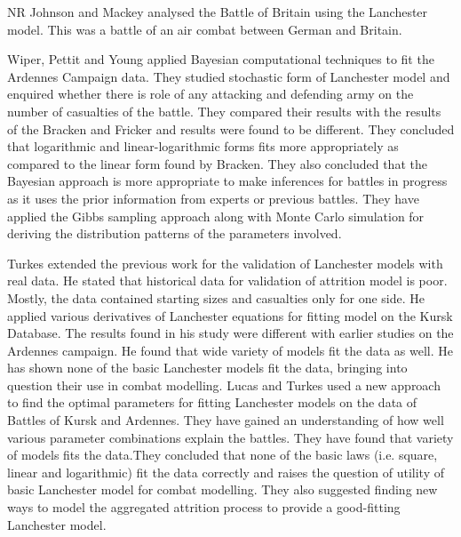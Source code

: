 \documentclass[]{article}
\begin{document}
NR Johnson and Mackey \autocite{JohsonMackey:2011}analysed the Battle of Britain using the Lanchester model. This was a battle of an air combat between German and Britain.

Wiper, Pettit and Young \autocite{WiperPetit:2000} applied Bayesian computational techniques to fit the Ardennes Campaign data. They studied stochastic form of Lanchester model and enquired whether there is role of any attacking and defending army on the number of casualties of the battle. They compared their results with the results of the Bracken and Fricker and results were found to be different. They concluded that logarithmic and linear-logarithmic forms fits more appropriately as compared to the linear form found by Bracken. They also concluded that the Bayesian approach is more appropriate to make inferences for battles in progress as it uses the prior information from experts or previous battles. They have applied the Gibbs sampling approach along with Monte Carlo simulation for deriving the distribution patterns of the parameters involved. 

Turkes \autocite{Turkes:2000} extended the previous work for the validation of Lanchester models with real data. He stated that historical data for validation of attrition model is poor. Mostly, the data contained starting sizes and casualties only for one side. He applied various derivatives of Lanchester equations for fitting model on the Kursk Database. The results found in his study were different with earlier studies on the Ardennes campaign. He found that wide variety of models fit the data as well. He has shown none of the basic Lanchester models fit the data, bringing into question their use in combat modelling. 
Lucas and Turkes \autocite{LukasTurkes:2004} used a new approach to find the optimal parameters for fitting Lanchester models on the data of Battles of Kursk and Ardennes. They have gained an understanding of how well various parameter combinations explain the battles. They have found that variety of models fits the data.They concluded that none of the basic laws (i.e. square, linear and logarithmic) fit the data correctly and raises the question of utility of basic Lanchester model for combat modelling. They also suggested finding new ways to model the aggregated attrition process to provide a good-fitting Lanchester model.
\end{document}
